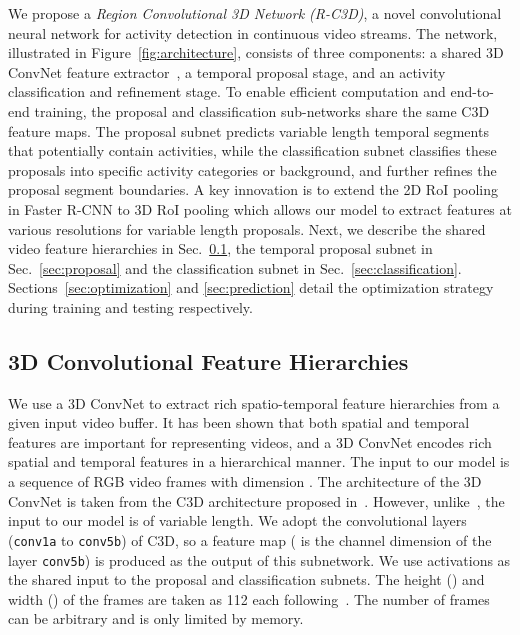 \documentclass[10pt,twocolumn,letterpaper]{article}
\begin{document}
We propose a \textit{Region Convolutional 3D Network (R-C3D)}, a novel convolutional neural network for activity detection in continuous video streams.
The network, illustrated in Figure~\ref{fig:architecture}, consists of three components: a shared 3D ConvNet feature extractor~\cite{tran2015learning}, a temporal proposal stage, and an activity classification and refinement stage.
To enable efficient computation and end-to-end training, the proposal and classification sub-networks share the same C3D feature maps.
The proposal subnet predicts variable length temporal segments that potentially contain activities, while the classification subnet classifies these proposals into specific activity categories or background, and further refines the proposal segment boundaries.
A key innovation is to extend the 2D RoI pooling in Faster R-CNN to 3D RoI pooling which allows our model to extract features at various resolutions for variable length proposals.
Next, we describe the shared video feature hierarchies in Sec.~\ref{sec:feature}, the temporal proposal subnet in Sec.~\ref{sec:proposal} and the classification subnet in Sec.~\ref{sec:classification}. Sections~\ref{sec:optimization} and \ref{sec:prediction} detail the optimization strategy during training and testing respectively.

\subsection{3D Convolutional Feature Hierarchies}
\label{sec:feature}
We use a 3D ConvNet to extract rich spatio-temporal feature hierarchies from a given input video buffer.
It has been shown that both spatial and temporal features are important for representing videos, and a 3D ConvNet encodes rich spatial and temporal features in a hierarchical manner.
The input to our model is a sequence of RGB video frames with dimension .
The architecture of the 3D ConvNet is taken from the C3D architecture proposed in~\cite{tran2015learning}.
However, unlike~\cite{tran2015learning}, the input to our model is of variable length.
We adopt the convolutional layers (\texttt{conv1a} to \texttt{conv5b}) of C3D, so a feature map  ( is the channel dimension of the layer \texttt{conv5b}) is produced as the output of this subnetwork.
We use  activations as the shared input to the proposal and classification subnets.
The height () and width () of the frames are taken as 112 each following~\cite{tran2015learning}.
The number of frames  can be arbitrary and is only limited by memory.
\end{document}
